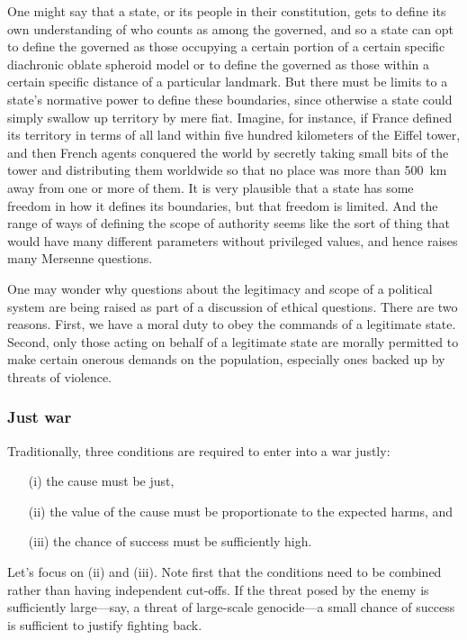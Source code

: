 One might say that a state, or its people in their constitution, gets to define 
its own understanding of who counts as among the governed, and so a state can opt to define the governed as those occupying a 
certain portion of a certain specific diachronic oblate spheroid model or to define the governed as those within a certain specific
distance of a particular landmark. But there must be limits to a state's normative power to define these boundaries, since otherwise
a state could simply swallow up territory by mere fiat. Imagine, for instance, if France defined its territory in terms of all land
within five hundred kilometers of the Eiffel tower, and then French agents conquered the world by secretly taking small bits
of the tower and distributing them worldwide so that no place was more than 500~km away from one or more of them. It is very plausible
that a state has some freedom in how it defines its boundaries, but that freedom is limited. And the range of ways of defining the
scope of authority seems like the sort of thing that would have many different parameters without privileged values, and hence 
raises many Mersenne questions.

One may wonder why questions about the legitimacy and scope of a political system are being raised as part of a discussion of ethical
questions. There are two reasons. First, we have a moral duty to obey the commands of a legitimate state. Second, only those
acting on behalf of a legitimate state are morally permitted to make certain onerous demands on the population, especially ones backed up 
by threats of violence.  

\subsubsection{Just war}
Traditionally, three conditions are required to enter into a war justly: 
\begin{enumerate}
\item[(i)] the cause must be just,
\item[(ii)] the value of the cause must be proportionate to the expected harms, and 
\item[(iii)] the chance of success must be 
sufficiently high. 
\end{enumerate}
Let's focus on (ii) and (iii). Note first that the conditions need to be combined rather than having independent cut-offs. If the threat posed by the enemy is sufficiently large---say, a threat of large-scale genocide---a small chance of success is sufficient to justify fighting back.

